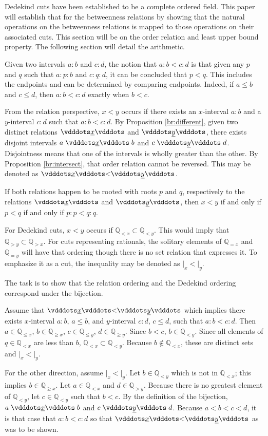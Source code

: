 \documentclass[12pt]{article}
\newcommand{\qcut}[2][x]{\ensuremath{\mathbb{Q}_{#2 #1}}}
\newcommand{\qlt}[1][x]{\qcut[#1]{<}}
\newcommand{\qeq}[1][x]{\qcut[#1]{=}}
\newcommand{\qgt}[1][x]{\qcut[#1]{>}}
\newcommand{\qgeq}[1][x]{\qcut[#1]{\geq}}
\newcommand{\qleq}[1][x]{\qcut[#1]{\leq}}
\newcommand{\cut}[1][x]{{\vert}_{#1} }
\newcommand{\yrel}{\xrel[y]}
\begin{document}
Dedekind cuts have been established to be a complete ordered field. This paper will establish that for the betweenness relations by showing that the natural operations on the betweenness relations is mapped to those operations on their associated cuts. This section will be on the order relation and least upper bound property. The following section will detail the arithmetic. 

Given two intervals $a:b$ and $c:d$, the notion that $a:b < c:d$ is that given any $p$ and $q$ such that $a:p:b$ and $c:q:d$, it can be concluded that $p < q$. This includes the endpoints and can be determined by comparing endpoints. Indeed, if $a\leq b$ and $c \leq d$, then $a:b < c:d$ exactly when $b < c$. 

From the relation perspective, $x < y$ occurs if there exists an $x$-interval $a:b$ and a $y$-interval $c:d$ such that $a:b < c:d$. By Proposition \ref{br:different}, given two distinct relations $\xrel$ and $\yrel$, there exists disjoint intervals $a \xrel b$ and $c \yrel d$. Disjointness means that one of the intervals is wholly greater than the other. By Proposition \ref{br:intersect}, that order relation cannot be reversed.  This may be denoted as $\xrel < \yrel$. 

If both relations happen to be  rooted with roots $p$ and $q$, respectively to the relations $\xrel$ and $\yrel$, then $x<y$ if and only if $p < q$ if and only if $p:p < q:q$. 

For Dedekind cuts, $x < y$ occurs if $\qlt \subset \qlt[y]$. This would imply that $\qgt[y] \subset \qgt$. For cuts representing rationals, the solitary elements of $\qeq$ and $\qeq[y]$ will have that ordering though there is no set relation that expresses it. To emphasize it as a cut, the inequality may be denoted as $\cut < \cut[y]$.

The task is to show that the relation ordering and the Dedekind ordering correspond under the bijection. 

Assume that $\xrel < \yrel$ which implies there exists $x$-interval $a:b$, $a \leq b$,  and $y$-interval $c:d$, $c \leq d$, such that $a:b < c:d$. Then $a \in \qleq$, $b \in \qgeq$, $c \in \qleq[y]$, $d \in \qgeq[y]$. Since $ b< c$, $b \in \qlt[y]$. Since all elements of $q \in \qlt$ are less than $b$, $\qlt \subset \qlt[y]$. Because $b\notin \qlt$, these are distinct sets and $\cut < \cut[y]$. 

For the other direction, assume $\cut < \cut[y]$. Let $b \in \qlt[y]$ which is not in $\qlt$; this implies $b \in \qgeq$. Let $a \in \qlt$ and $d \in \qgt[y]$.  Because there is no greatest element of $\qlt[y]$, let $c\in \qlt[y]$ such that $b < c$. By the definition of the bijection,  $a \xrel b$ and $c \yrel d$. Because $a < b < c < d$, it is that case that $a:b < c:d$ so that $\xrel < \yrel$ as was to be shown. 
\end{document}
